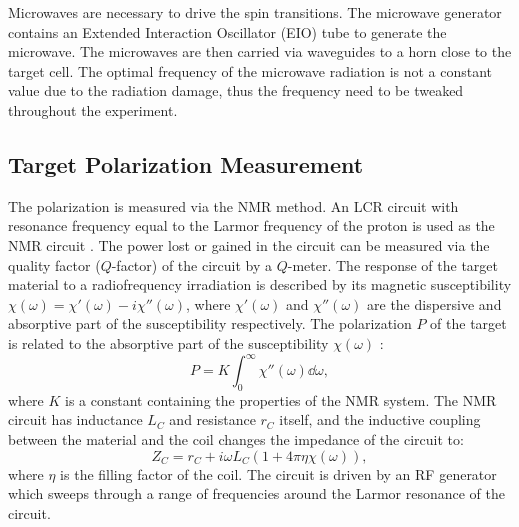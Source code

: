 Microwaves are necessary to drive the spin transitions. The microwave generator contains an Extended Interaction Oscillator (EIO) tube to generate the microwave. The microwaves are then carried via waveguides to a horn close to the target cell. The optimal frequency of the microwave radiation is not a constant value due to the radiation damage, thus the frequency need to be tweaked throughout the experiment.

\subsection{Target Polarization Measurement}
\label{C5S3SS3}

The polarization is measured via the NMR method. An LCR circuit with resonance frequency equal to the Larmor frequency of the proton is used as the NMR circuit \cite{Crabb1997}. The power lost or gained in the circuit can be measured via the quality factor ($Q$-factor) of the circuit by a $Q$-meter. The response of the target material to a radiofrequency irradiation is described by its magnetic susceptibility $\chi(\omega)=\chi'(\omega)-i\chi''(\omega)$, where $\chi'(\omega)$ and $\chi''(\omega)$ are the dispersive and absorptive part of the susceptibility respectively. The polarization $P$ of the target is related to the absorptive part of the susceptibility $\chi(\omega)$ \cite{Goldman1975}:
\begin{equation} \label{C5S3SS3E1}
P = K\int_0^\infty\chi''(\omega)\dd{\omega},
\end{equation}
where $K$ is a constant containing the properties of the NMR system. The NMR circuit has inductance $L_C$ and resistance $r_C$ itself, and the inductive coupling between the material and the coil changes the impedance of the circuit to:
\begin{equation} \label{C5S3SS3E2}
Z_C = r_C+i\omega L_C(1+4\pi\eta\chi(\omega)),
\end{equation}
where $\eta$ is the filling factor of the coil. The circuit is driven by an RF generator which sweeps through a range of frequencies around the Larmor resonance of the circuit.

